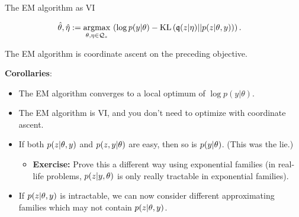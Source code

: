 \begin{frame}{The EM algorithm as VI}

\begin{align*}
%
\thetahat, \etaopt :={}& \argmax{\theta, \eta \in \qdom_z} \left(
\log p(\y | \theta) -
    \kl{\q(\z | \eta)}{p(\z | \theta, \y)}  \right).
%
\end{align*}
%

The EM algorithm is coordinate ascent on the preceding objective.\\
\citep{neal1998view}

\textbf{Corollaries}:

\begin{itemize}
%
\item<2-> The EM algorithm converges to a local optimum of $\log p(y | \theta)$.
%
\item<3-> The EM algorithm is VI, and you don't need to optimize with coordinate
ascent.
%
\item<4-> If both $p(z | \theta, y)$ and $p(z, y | \theta )$ are easy,
then so is $p(y | \theta)$.  (This was the lie.)
\begin{itemize}
    \item<5-> \textbf{Exercise: } Prove this a different way using exponential
    families (in real-life problems, $p(z | y, \theta)$ is only
    really tractable in exponential families).
\end{itemize}
%
\item<6-> If $p(z | \theta, y)$ is intractable, we can now consider different
approximating families which may not contain $p(z | \theta, y)$.
%
\end{itemize}

\end{frame}



